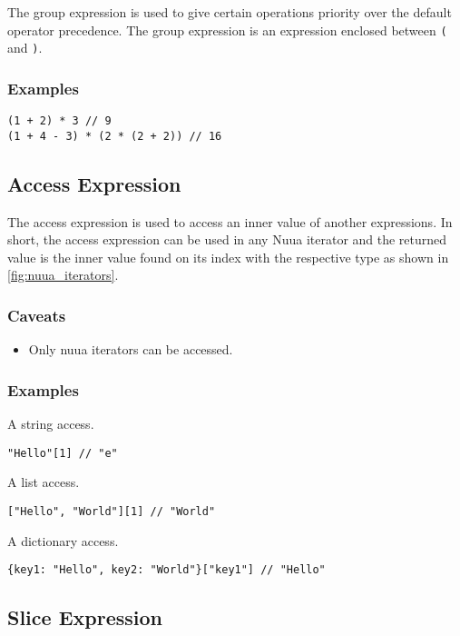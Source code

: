 The group expression is used to give certain operations priority over the default operator precedence.
The group expression is an expression enclosed between \texttt{(} and \texttt{)}.

\subsubsection{Examples}

\begin{lstlisting}
(1 + 2) * 3 // 9
(1 + 4 - 3) * (2 * (2 + 2)) // 16
\end{lstlisting}

\subsection{Access Expression}

The access expression is used to access an inner value of another expressions. In short, the access expression can be used in any
Nuua iterator and the returned value is the inner value found on its index with the respective type as shown in \autoref{fig:nuua_iterators}.

\subsubsection{Caveats}

\begin{itemize}
    \item Only nuua iterators can be accessed.
\end{itemize}

\subsubsection{Examples}

A string access.
\begin{lstlisting}
"Hello"[1] // "e"
\end{lstlisting}
A list access.
\begin{lstlisting}
["Hello", "World"][1] // "World"
\end{lstlisting}
A dictionary access.
\begin{lstlisting}
{key1: "Hello", key2: "World"}["key1"] // "Hello"
\end{lstlisting}

\subsection{Slice Expression}

